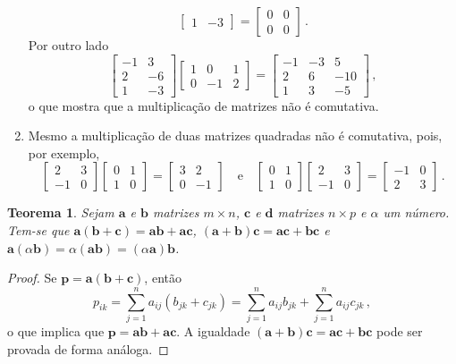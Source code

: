 \documentclass[12pt,a4paper]{report}
\newcommand{\mb}{\mathbf}
\newtheorem{thm}{Teorema}[chapter]
\begin{document}
\begin{enumerate}
$$\begin{bmatrix}
    1&-3
  \end{bmatrix}=\begin{bmatrix}
    0&0\\
    0&0
  \end{bmatrix}\,.$$
  Por outro lado
  $$\begin{bmatrix}
    -1&3\\
    2&-6\\
    1&-3
  \end{bmatrix}\begin{bmatrix}
    1&0&1\\
    0&-1&2
  \end{bmatrix}=\begin{bmatrix}
    -1&-3&5\\
    2&6&-10\\
    1&3&-5
  \end{bmatrix}\,,$$
  o que mostra que a multiplicação de matrizes não é comutativa.
  \item Mesmo a multiplicação de duas matrizes quadradas não é comutativa, pois, por exemplo,
  $$\begin{bmatrix}
    2&3\\
    -1&0
  \end{bmatrix} \begin{bmatrix}
    0&1\\
    1&0
  \end{bmatrix}=\begin{bmatrix}
    3&2\\
    0&-1
  \end{bmatrix}\quad\text{e}\quad\begin{bmatrix}
    0&1\\
    1&0
  \end{bmatrix} \begin{bmatrix}
    2&3\\
    -1&0
  \end{bmatrix}= \begin{bmatrix}
    -1&0\\
    2&3
  \end{bmatrix}\,.$$
\end{enumerate}

\begin{thm}
  Sejam $\mb a$ e $\mb b$ matrizes $m\times n$, $\mb c$ e $\mb d$ matrizes $n\times p$ e $\alpha$ um número. Tem-se que $\mb a(\mb b+\mb c)=\mb {ab}+\mb{ac}$, $(\mb a+\mb b)\mb c=\mb {ac}+\mb{bc}$ e $\mb a(\alpha\mb b)=\alpha (\mb {ab})=(\alpha \mb a)\mb b$.
\end{thm}
\begin{proof}
  Se $\mb p=\mb a(\mb b+\mb c)$, então
  $$p_{ik}=\sum_{j=1}^na_{ij}(b_{jk}+c_{jk})=\sum_{j=1}^na_{ij}b_{jk}+\sum_{j=1}^na_{ij}c_{jk}\,,$$
  o que implica que $\mb p=\mb {ab}+\mb{ac}$. A igualdade $(\mb a+\mb b)\mb c=\mb {ac}+\mb{bc}$ pode ser provada de forma análoga.
\end{proof}
\end{document}
